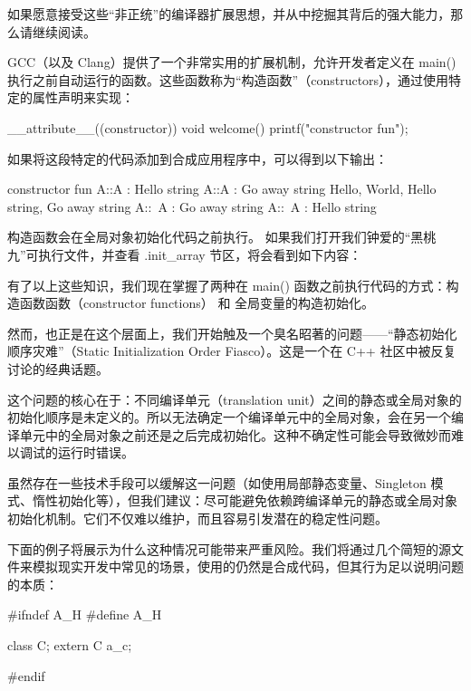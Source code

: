 如果愿意接受这些“非正统”的编译器扩展思想，并从中挖掘其背后的强大能力，那么请继续阅读。

GCC（以及 Clang）提供了一个非常实用的扩展机制，允许开发者定义在 main() 执行之前自动运行的函数。这些函数称为“构造函数”（constructors），通过使用特定的属性声明来实现：

\begin{cpp}
__attribute__((constructor)) void welcome() {
printf("constructor fun\n");
}
\end{cpp}

如果将这段特定的代码添加到合成应用程序中，可以得到以下输出：

\begin{shell}
constructor fun
A::A : Hello string
A::A : Go away string
Hello, World, Hello string, Go away string
A::~A : Go away string
A::~A : Hello string
\end{shell}

构造函数会在全局对象初始化代码之前执行。 如果我们打开我们钟爱的“黑桃九”可执行文件，并查看 .init\_array 节区，将会看到如下内容：


有了以上这些知识，我们现在掌握了两种在 main() 函数之前执行代码的方式：构造函数函数（constructor functions） 和 全局变量的构造初始化。

然而，也正是在这个层面上，我们开始触及一个臭名昭著的问题——“静态初始化顺序灾难”（Static Initialization Order Fiasco）。这是一个在 C++ 社区中被反复讨论的经典话题。

这个问题的核心在于：不同编译单元（translation unit）之间的静态或全局对象的初始化顺序是未定义的。所以无法确定一个编译单元中的全局对象，会在另一个编译单元中的全局对象之前还是之后完成初始化。这种不确定性可能会导致微妙而难以调试的运行时错误。

虽然存在一些技术手段可以缓解这一问题（如使用局部静态变量、Singleton 模式、惰性初始化等），但我们建议：尽可能避免依赖跨编译单元的静态或全局对象初始化机制。它们不仅难以维护，而且容易引发潜在的稳定性问题。

下面的例子将展示为什么这种情况可能带来严重风险。我们将通过几个简短的源文件来模拟现实开发中常见的场景，使用的仍然是合成代码，但其行为足以说明问题的本质：


\begin{cpp}
#ifndef A_H
#define A_H

class C;
extern C a_c;

#endif
\end{cpp}


